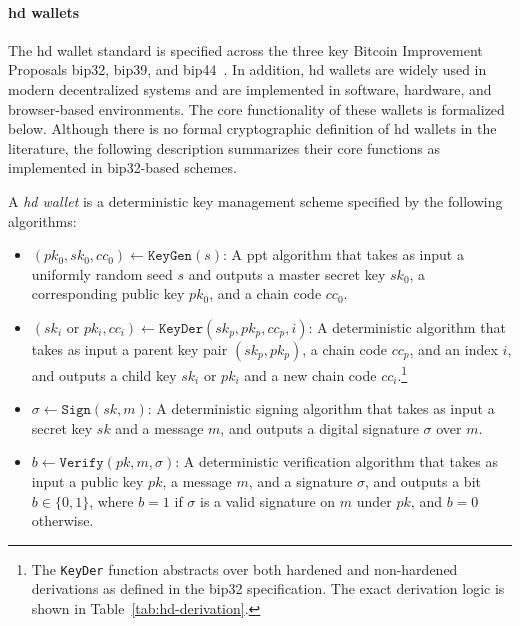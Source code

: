 \paragraph{\acrshort{hd} wallets}
The \acrshort{hd} wallet standard is specified across the three key Bitcoin Improvement Proposals \acrshort{bip32}, \acrshort{bip39}, and \acrshort{bip44}~\cite{bip32,bip39,bip44}. In addition, \acrshort{hd} wallets are widely used in modern decentralized systems and are implemented in software, hardware, and browser-based environments. The core functionality of these wallets is formalized below. Although there is no formal cryptographic definition of \acrshort{hd} wallets in the literature, the following description summarizes their core functions as implemented in \acrshort{bip32}-based schemes.

\begin{definition}
	A \textit{\acrshort{hd} wallet} is a deterministic key management scheme specified by the following algorithms:
	
	\begin{itemize}
		\item $(pk_0, sk_0, cc_0) \leftarrow \texttt{KeyGen}(s)$: A \acrfull{ppt} algorithm that takes as input a uniformly random seed $s$ and outputs a master secret key $sk_0$, a corresponding public key $pk_0$, and a chain code $cc_0$.
		
		\item $(sk_i \text{ or } pk_i, cc_i) \leftarrow \texttt{KeyDer}(sk_p, pk_p, cc_p, i)$: A deterministic algorithm that takes as input a parent key pair $(sk_p, pk_p)$, a chain code $cc_p$, and an index $i$, and outputs a child key $sk_i$ or $pk_i$ and a new chain code $cc_i$.\footnote{The \texttt{KeyDer} function abstracts over both hardened and non-hardened derivations as defined in the \acrshort{bip32} specification. The exact derivation logic is shown in Table~\ref{tab:hd-derivation}.}
		
		\item $\sigma \leftarrow \texttt{Sign}(sk, m)$: A deterministic signing algorithm that takes as input a secret key $sk$ and a message $m$, and outputs a digital signature $\sigma$ over $m$.
		
		\item $b \leftarrow \texttt{Verify}(pk, m, \sigma)$: A deterministic verification algorithm that takes as input a public key $pk$, a message $m$, and a signature $\sigma$, and outputs a bit $b \in \{0,1\}$, where $b = 1$ if $\sigma$ is a valid signature on $m$ under $pk$, and $b = 0$ otherwise.
	\end{itemize}
\end{definition}


